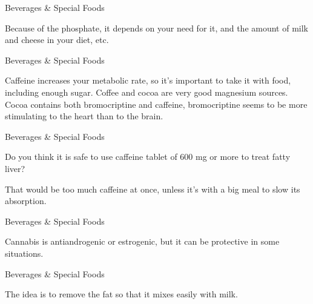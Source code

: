\documentclass[11pt,oneside,openany,extrafontsizes]{memoir}
\begin{document}
\begin{standalonequote}{Beverages \& Special Foods}

    \begin{answer}
        Because of the phosphate, it depends on your need for it, and the amount of milk and cheese in your diet, etc.
    \end{answer}
\end{standalonequote}

\begin{standalonequote}{Beverages \& Special Foods}

    \begin{answer}
        Caffeine increases your metabolic rate, so it's important to take it with food, including enough sugar. Coffee and cocoa are very good magnesium sources. Cocoa contains both bromocriptine and caffeine, bromocriptine seems to be more stimulating to the heart than to the brain.
    \end{answer}
\end{standalonequote}

\begin{qaexchange}{Beverages \& Special Foods}

    \begin{question}
        Do you think it is safe to use caffeine tablet of 600 mg or more to treat fatty liver?
    \end{question}

    \begin{answer}
        That would be too much caffeine at once, unless it's with a big meal to slow its absorption.
    \end{answer}
\end{qaexchange}

\begin{standalonequote}{Beverages \& Special Foods}

    \begin{answer}
        Cannabis is antiandrogenic or estrogenic, but it can be protective in some situations.
    \end{answer}
\end{standalonequote}

\begin{standalonequote}{Beverages \& Special Foods}

    \begin{answer}
        The idea is to remove the fat so that it mixes easily with milk.
    \end{answer}
\end{standalonequote}
\end{document}
